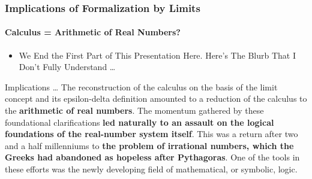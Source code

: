 \begin{frame}
\frametitle{Implications of Formalization by Limits}
\framesubtitle{Calculus = Arithmetic of Real Numbers?}
\label{slide:implications}
\begin{itemize}
\pause
\item We End the First Part of This Presentation Here. Here's The Blurb That I Don't Fully Understand \dots
\end{itemize}
\begin{block}{Implications \dots}
The reconstruction of the calculus on the basis of the limit concept and its epsilon-delta definition amounted to a reduction of the calculus to the \textbf{arithmetic of real numbers}. The momentum gathered by these foundational clarifications \textbf{led naturally to an assault on the logical foundations of the real-number system itself}. This was a return after two and a half millenniums to \textbf{the problem of irrational numbers, which the Greeks had abandoned as hopeless after Pythagoras}. One of the tools in these efforts was the newly developing field of mathematical, or symbolic, logic.
\end{block}
\end{frame}
